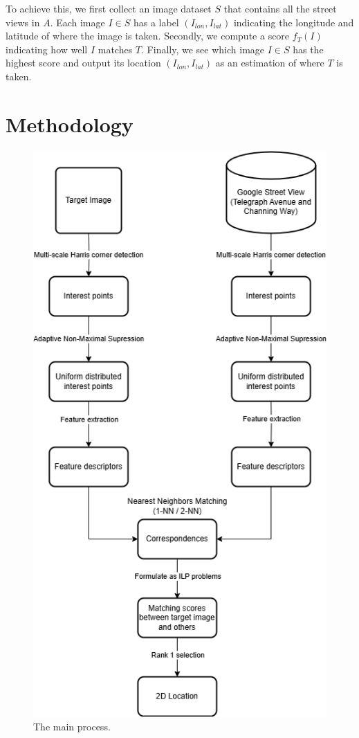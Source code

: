 \documentclass[10pt,twocolumn,letterpaper]{article}
\begin{document}
To achieve this, we first collect an image dataset $S$ that contains all the street views in $A$. Each image $I \in S$ has a label $(I_{lon}, I_{lat})$ indicating the longitude and latitude of where the image is taken. Secondly, we compute a score $f_T(I)$ indicating how well $I$ matches $T$. Finally, we see which image $I \in S$ has the highest score and output its location $(I_{lon}, I_{lat})$ as an estimation of where $T$ is taken. 

\section{Methodology}

\begin{figure}[t]
  \centering
  \includegraphics[width=1.0\linewidth]{fig/alg.png}
   \caption{The main process.}
   \label{fig:alg}
\end{figure}
\end{document}
